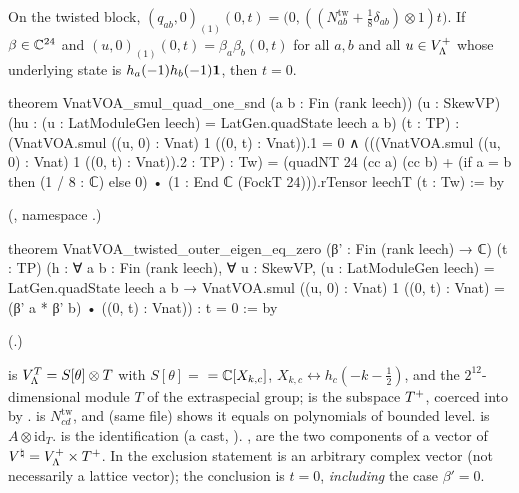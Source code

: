 \begin{lemma}\label{ch20:lem:twisted}
On the twisted block, $(q_{ab},0)_{(1)}(0,t)=\bigl(0,((N^{\mathrm{tw}}_{ab}+\tfrac18\delta_{ab})\otimes1)t\bigr)$.  If
$\beta\in{\mathbb{C}}^{24}$ and $(u,0)_{(1)}(0,t)=\beta_a\beta_b(0,t)$ for all $a,b$ and all $u\in V_{\Lambda}^{+}$ whose underlying state is
$h_a(-1)h_b(-1)\mathbf 1$, then $t=0$.
\end{lemma}
\begin{leancode}
theorem VnatVOA_smul_quad_one_snd (a b : Fin (rank leech)) (u : SkewVP)
    (hu : (u : LatModuleGen leech) = LatGen.quadState leech a b) (t : TP) :
    (VnatVOA.smul ((u, 0) : Vnat) 1 ((0, t) : Vnat)).1 = 0 ∧
      (((VnatVOA.smul ((u, 0) : Vnat) 1 ((0, t) : Vnat)).2 : TP) : Tw)
        = (quadNT 24 (cc a) (cc b)
            + (if a = b then (1 / 8 : ℂ) else 0) • (1 : End ℂ (FockT 24))).rTensor leechT (t : Tw) := by
\end{leancode}
(, namespace .)
\begin{leancode}
theorem VnatVOA_twisted_outer_eigen_eq_zero (β' : Fin (rank leech) → ℂ) (t : TP)
    (h : ∀ a b : Fin (rank leech), ∀ u : SkewVP,
      (u : LatModuleGen leech) = LatGen.quadState leech a b →
        VnatVOA.smul ((u, 0) : Vnat) 1 ((0, t) : Vnat) = (β' a * β' b) • ((0, t) : Vnat)) :
    t = 0 := by
\end{leancode}
(.)
\begin{dictionary}
 is $V_{\Lambda}^T=S[\theta]\otimes T$ with $S[\theta]=$  $={\mathbb{C}}[X_{k,c}]$, $X_{k,c}\leftrightarrow
h_c(-k-\tfrac12)$, and  the $2^{12}$-dimensional module $T$ of the extraspecial group;  is the
subspace $T^{+}$, coerced into  by .   is $N^{\mathrm{tw}}_{cd}$, and
 (same file) shows it equals  on polynomials of bounded level.
 is $A\otimes\mathrm{id}_T$.   is the identification 
(a cast, ).  ,  are the two components of a vector of
${V^{\natural}}=V_{\Lambda}^{+}\times T^{+}$.  In the exclusion statement  is an arbitrary complex vector (not
necessarily a lattice vector); the conclusion is $t=0$, \emph{including} the case $\beta'=0$.
\end{dictionary}
